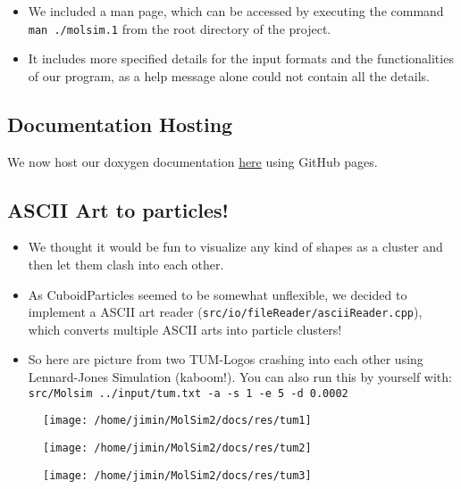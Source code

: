 \documentclass{article}
\begin{document}
\begin{itemize}
    \item We included a man page, which can be accessed by executing the command \texttt{man ./molsim.1} from the root directory of the project.
    \item It includes more specified details for the input formats and the functionalities of our program, as a help message alone could not contain all the details.
\end{itemize}

\subsection{Documentation Hosting}
We now host our doxygen documentation \href{https://noahpy.github.io/MolSim-SS24/}{here} using GitHub pages. 

\subsection{ASCII Art to particles!}
\begin{itemize}
    \item We thought it would be fun to visualize any kind of shapes as a cluster and then let them clash into each other.
    \item As CuboidParticles seemed to be somewhat unflexible, we decided to implement a ASCII art reader (\verb|src/io/fileReader/asciiReader.cpp|), which converts multiple ASCII arts into particle clusters!
    \item So here are picture from two TUM-Logos crashing into each other using Lennard-Jones Simulation (kaboom!). You can also run this by yourself with: \verb|src/Molsim ../input/tum.txt -a -s 1 -e 5 -d 0.0002|
\end{itemize}
\begin{figure}[H]
        \texttt{[image: /home/jimin/MolSim2/docs/res/tum1]}
    \end{figure}
\begin{figure}[H]
        \texttt{[image: /home/jimin/MolSim2/docs/res/tum2]}
    \end{figure}
\begin{figure}[H]
        \texttt{[image: /home/jimin/MolSim2/docs/res/tum3]}
    \end{figure}
\end{document}

